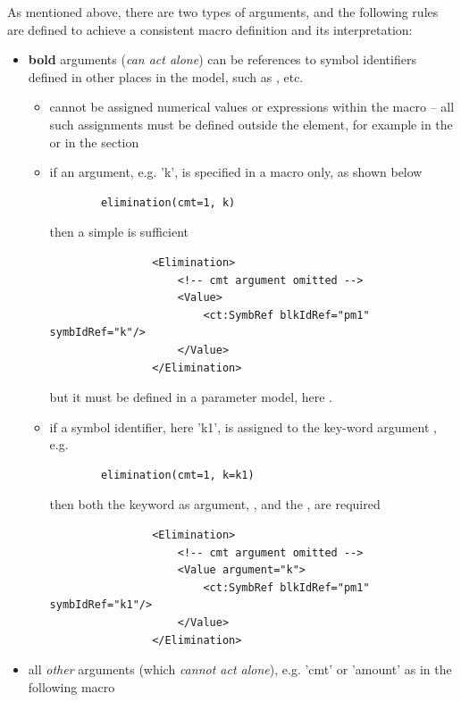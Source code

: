 As mentioned above, there are two types of arguments, and the following rules 
are defined to achieve a consistent macro definition and its interpretation:
\begin{itemize}
\item
\textbf{bold} arguments (\emph{can act alone}) can be references to symbol identifiers defined in other 
places in the model, such as ,  etc.
\begin{itemize}
\item
cannot be assigned numerical values or expressions within the macro -- 
all such assignments must be defined outside the  element, for example in the 
 or in the  section
\item
if an argument, e.g. 'k', is specified in a macro only, as shown below
\lstset{language=NONMEMdataSet}
\begin{lstlisting}
		elimination(cmt=1, k)
\end{lstlisting}
then a simple  is sufficient
 \lstset{language=XML}
\begin{lstlisting}
                <Elimination>
                    <!-- cmt argument omitted -->
                    <Value>
                        <ct:SymbRef blkIdRef="pm1" symbIdRef="k"/>
                    </Value>
                </Elimination>
\end{lstlisting}
but it must be defined in a parameter model, here .
\item
if a symbol identifier, here 'k1', is assigned to the key-word argument , e.g.
\lstset{language=NONMEMdataSet}
\begin{lstlisting}
		elimination(cmt=1, k=k1)
\end{lstlisting}
 then both the keyword as argument, , and the ,  are required 
 \lstset{language=XML}
\begin{lstlisting}
                <Elimination>
                    <!-- cmt argument omitted -->
                    <Value argument="k">
                        <ct:SymbRef blkIdRef="pm1" symbIdRef="k1"/>
                    </Value>
                </Elimination>
\end{lstlisting}
\end{itemize}
\item
all \textit{other} arguments (which \emph{cannot act alone}), e.g. 'cmt' or 'amount' as in the following macro
\lstset{language=NONMEMdataSet}
\begin{lstlisting}

\end{lstlisting}
\end{itemize}
